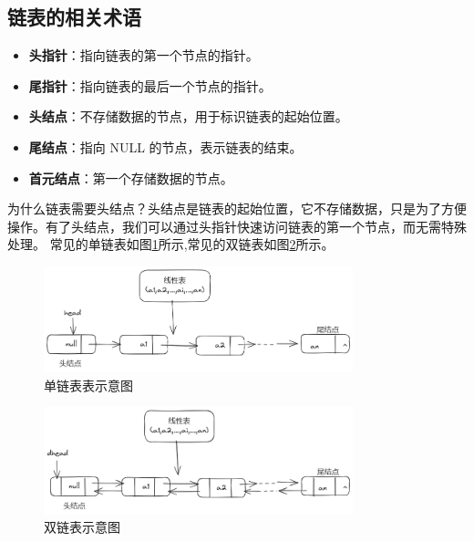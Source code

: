 \documentclass[lang=cn,newtx,10pt,scheme=chinese]{../elegantbook}
\begin{document}
\subsection{链表的相关术语}
\begin{itemize}
  \item \textbf{头指针}：指向链表的第一个节点的指针。
  \item \textbf{尾指针}：指向链表的最后一个节点的指针。
  \item \textbf{头结点}：不存储数据的节点，用于标识链表的起始位置。
  \item \textbf{尾结点}：指向 NULL 的节点，表示链表的结束。
  \item \textbf{首元结点}：第一个存储数据的节点。
\end{itemize}
为什么链表需要头结点？头结点是链表的起始位置，它不存储数据，只是为了方便操作。有了头结点，我们可以通过头指针快速访问链表的第一个节点，而无需特殊处理。
常见的单链表如图\ref{fig:single_linked_list}所示,常见的双链表如图\ref{fig:double_linked_list}所示。
\begin{figure}[!htbp]
  \centering
  \includegraphics[width=0.8\textwidth]{./image/singleLink.png}
  \caption{单链表表示意图}
  \label{fig:single_linked_list}
\end{figure}

\begin{figure}[!htbp]
  \centering
  \includegraphics[width=0.8\textwidth]{./image/doubleLink.png}
  \caption{双链表示意图}
  \label{fig:double_linked_list}
\end{figure}
\end{document}

